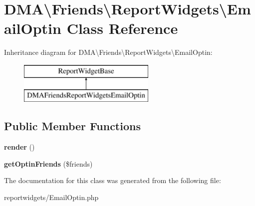 \hypertarget{classDMA_1_1Friends_1_1ReportWidgets_1_1EmailOptin}{}\section{D\+M\+A\textbackslash{}Friends\textbackslash{}Report\+Widgets\textbackslash{}Email\+Optin Class Reference}
\label{classDMA_1_1Friends_1_1ReportWidgets_1_1EmailOptin}
Inheritance diagram for D\+M\+A\textbackslash{}Friends\textbackslash{}Report\+Widgets\textbackslash{}Email\+Optin\+:\begin{figure}[H]
\begin{center}
\leavevmode
\includegraphics[height=2.000000cm]{d1/d13/classDMA_1_1Friends_1_1ReportWidgets_1_1EmailOptin}
\end{center}
\end{figure}
\subsection*{Public Member Functions}
\begin{DoxyCompactItemize}
\item 
\hypertarget{classDMA_1_1Friends_1_1ReportWidgets_1_1EmailOptin_add511010af69b7e16174de04e1b80819}{}{\bfseries render} ()\label{classDMA_1_1Friends_1_1ReportWidgets_1_1EmailOptin_add511010af69b7e16174de04e1b80819}

\item 
\hypertarget{classDMA_1_1Friends_1_1ReportWidgets_1_1EmailOptin_a462b84aaa175254b4584f59ff58e82e7}{}{\bfseries get\+Optin\+Friends} (\$friends)\label{classDMA_1_1Friends_1_1ReportWidgets_1_1EmailOptin_a462b84aaa175254b4584f59ff58e82e7}

\end{DoxyCompactItemize}


The documentation for this class was generated from the following file\+:\begin{DoxyCompactItemize}
\item 
reportwidgets/Email\+Optin.\+php\end{DoxyCompactItemize}
